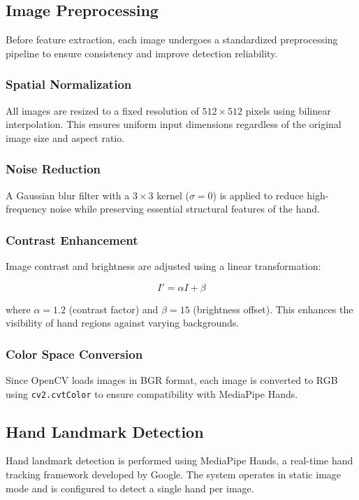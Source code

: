 \subsection{Image Preprocessing}
Before feature extraction, each image undergoes a standardized preprocessing pipeline to ensure consistency and improve detection reliability.

\subsubsection{Spatial Normalization}
All images are resized to a fixed resolution of $512 \times 512$ pixels using bilinear interpolation. This ensures uniform input dimensions regardless of the original image size and aspect ratio.

\subsubsection{Noise Reduction}
A Gaussian blur filter with a $3 \times 3$ kernel ($\sigma = 0$) is applied to reduce high-frequency noise while preserving essential structural features of the hand.

\subsubsection{Contrast Enhancement}
Image contrast and brightness are adjusted using a linear transformation:

\[
I' = \alpha I + \beta
\]

where $\alpha = 1.2$ (contrast factor) and $\beta = 15$ (brightness offset). This enhances the visibility of hand regions against varying backgrounds.

\subsubsection{Color Space Conversion}
Since OpenCV loads images in BGR format, each image is converted to RGB using \texttt{cv2.cvtColor} to ensure compatibility with MediaPipe Hands.

\subsection{Hand Landmark Detection}

Hand landmark detection is performed using MediaPipe Hands, a real-time hand tracking framework developed by Google. The system operates in static image mode and is configured to detect a single hand per image.

